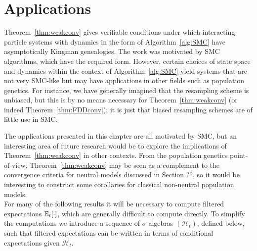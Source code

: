 \chapter{Applications} %
\label{ch:appl}



Theorem~\ref{thm:weakconv} gives verifiable conditions under which interacting particle systems with dynamics in the form of Algorithm~\ref{alg:SMC} have asymptotically Kingman genealogies. 
The work was motivated by SMC algorithms, which have the required form. However, certain choices of state space and dynamics within the context of Algorithm~\ref{alg:SMC} yield systems that are not very SMC-like but may have applications in other fields such as population genetics. 
For instance, we have generally imagined that the resampling scheme is unbiased, but this is by no means necessary for Theorem~\ref{thm:weakconv} (or indeed Theorem~\ref{thm:FDDconv}); it is just that biased resampling schemes are of little use in SMC.

The applications presented in this chapter are all motivated by SMC, but an interesting area of future research would be to explore the implications of Theorem~\ref{thm:weakconv} in other contexts. From the population genetics point-of-view, Theorem~\ref{thm:weakconv} may be seen as a complement to the convergence criteria for neutral models \parencite[e.g.][]{mohle1999} discussed in Section ??, so it would be interesting to construct some corollaries for classical non-neutral population models.\\

For many of the following results it will be necessary to compute filtered expectations $\mathbb{E}_t[\cdot]$, which are generally difficult to compute directly. 
To simplify the computations we introduce a sequence of $\sigma$-algebras $(\mathcal{H}_t)$, defined below, such that filtered expectations can be written in terms of conditional expectations given $\mathcal{H}_t$.

